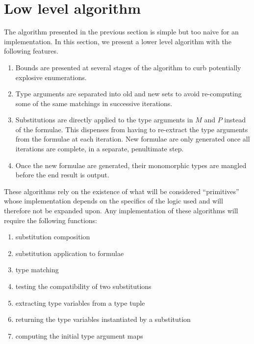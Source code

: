 \documentclass[]{ceurart}
\begin{document}
\section{Low level algorithm}
\label{sec:low-level-algorithm}

The algorithm presented in the previous section is simple but too naive for an implementation. In this section, we present a lower level algorithm with the following features.
\begin{enumerate}
    \item[\labelitemi] Bounds are presented at several stages of the algorithm to curb potentially explosive enumerations.

    \item[\labelitemi] Type arguments are separated into old and new sets to avoid re-computing some of the same matchings in successive iterations.

    \item[\labelitemi] Substitutions are directly applied to the type arguments in $M$ and $P$ instead of the formulae. This dispenses from having to re-extract the type arguments from the formulae at each iteration. New formulae are only generated once all iterations are complete, in a separate, penultimate step.

    \item[\labelitemi] Once the new formulae are generated, their monomorphic types are mangled before the end result is output.
\end{enumerate}


These algorithms rely on the existence of what will be considered ``primitives'' whose implementation depends on the specifics of the logic used and will therefore not be expanded upon. Any implementation of these algorithms will require the following functions:
\begin{enumerate}
   \item[\labelitemi] substitution composition
   \item[\labelitemi] substitution application to formulae
   \item[\labelitemi] type matching
   \item[\labelitemi] testing the compatibility of two substitutions
   \item[\labelitemi] extracting type variables from a type tuple
   \item[\labelitemi] returning the type variables instantiated by a substitution
   \item[\labelitemi] computing the initial type argument maps
\end{enumerate}
\end{document}
